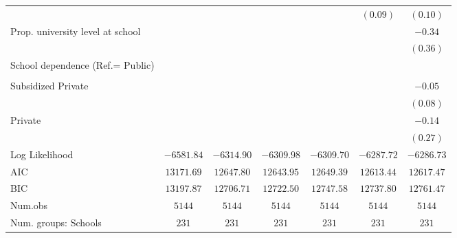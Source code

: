 \documentclass[
  12pt,
  letterpaper,
]{article}
\begin{document}
\begin{table}
{\begin{center}
{\begin{threeparttable}
\begin{tabular}{l c c c c c c}
                                                       &               &               &               &               & $(0.09)$      & $(0.10)$      \\
Prop. university level at school                       &               &               &               &               &               & $-0.34$       \\
                                                       &               &               &               &               &               & $(0.36)$      \\
School dependence (Ref.= Public)                       &               &               &               &               &               &               \\
                                                       &               &               &               &               &               &               \\
\quad Subsidized Private                               &               &               &               &               &               & $-0.05$       \\
                                                       &               &               &               &               &               & $(0.08)$      \\
\quad Private                                          &               &               &               &               &               & $-0.14$       \\
                                                       &               &               &               &               &               & $(0.27)$      \\
\midrule
Log Likelihood                                         & $-6581.84$    & $-6314.90$    & $-6309.98$    & $-6309.70$    & $-6287.72$    & $-6286.73$    \\
AIC                                                    & $13171.69$    & $12647.80$    & $12643.95$    & $12649.39$    & $12613.44$    & $12617.47$    \\
BIC                                                    & $13197.87$    & $12706.71$    & $12722.50$    & $12747.58$    & $12737.80$    & $12761.47$    \\
Num.obs                                                & $5144$        & $5144$        & $5144$        & $5144$        & $5144$        & $5144$        \\
Num. groups: Schools                                   & $231$         & $231$         & $231$         & $231$         & $231$         & $231$         \\

\end{tabular}
\end{threeparttable}}
\end{center}}
\end{table}
\end{document}
